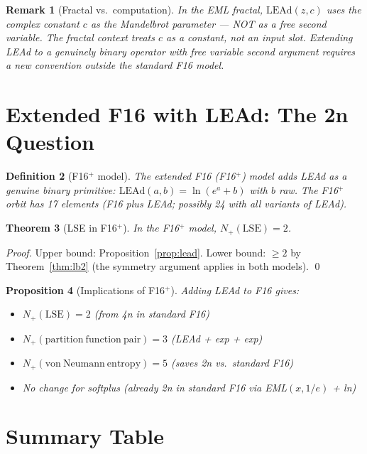 \documentclass[11pt]{article}
\newtheorem{theorem}{Theorem}
\newtheorem{proposition}[theorem]{Proposition}
\newtheorem{definition}[theorem]{Definition}
\newtheorem{remark}[theorem]{Remark}
\begin{document}
\begin{remark}[Fractal vs.\ computation]
In the EML fractal, $\mathrm{LEAd}(z, c)$ uses the complex constant $c$
as the Mandelbrot parameter — NOT as a free second variable. The fractal
context treats $c$ as a constant, not an input slot. Extending LEAd to a
genuinely binary operator with free variable second argument requires a
new convention outside the standard F16 model.
\end{remark}

\section{Extended F16 with LEAd: The 2n Question}

\begin{definition}[F16$^+$ model]
The \emph{extended F16} (F16$^+$) model adds LEAd as a genuine binary primitive:
$\mathrm{LEAd}(a, b) = \ln(e^a + b)$ with $b$ raw. The F16$^+$ orbit has 17 elements
(F16 plus LEAd; possibly 24 with all variants of LEAd).
\end{definition}

\begin{theorem}[LSE in F16$^+$]
In the F16$^+$ model, $N_+(\mathrm{LSE}) = 2$.
\end{theorem}

\begin{proof}
Upper bound: Proposition~\ref{prop:lead}. Lower bound: $\geq 2$ by
Theorem~\ref{thm:lb2} (the symmetry argument applies in both models). \qed
\end{proof}

\begin{proposition}[Implications of F16$^+$]
Adding LEAd to F16 gives:
\begin{itemize}
  \item $N_+(\mathrm{LSE}) = 2$ (from 4n in standard F16)
  \item $N_+(\mathrm{partition\ function\ pair}) = 3$ (LEAd + exp + exp)
  \item $N_+(\mathrm{von\ Neumann\ entropy}) = 5$ (saves 2n vs.\ standard F16)
  \item No change for softplus (already 2n in standard F16 via EML$(x,1/e)$ + ln)
\end{itemize}
\end{proposition}

\section{Summary Table}
\end{document}
